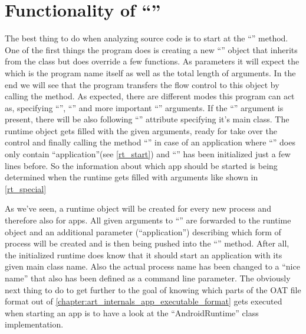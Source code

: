 \section{Functionality of ``''}
\label{section:app_main}
The best thing to do when analyzing source code is to start at the
``'' method. One of the first things the program does is
creating a new ``'' object that inherits from the
 class but does override a few functions. As parameters it will expect the 
which is the program name itself as well as the total length of arguments.
In the end we will see that the program transfers the flow control to this object by calling the  method. As expected, there
are different modes this program can act as, specifying ``'',
``'' and more important ``'' arguments.
If the ``'' argument is present, there will be also following ``'' attribute specifying it's main class.
The runtime object gets filled with the given arguments, ready for take
over the control and finally calling the method ``'' in case of an application
where ``'' does only contain ``application''(see \autoref{rt_start}) and ``'' has been initialized just a few lines before. So the information about which app should be started is being determined
when the runtime gets filled with arguments like shown in \autoref{rt_special}





As we've seen, a runtime object will be created for every new process and
therefore also for apps. All given arguments to ``''
are forwarded to the runtime object and an additional parameter (``application'') describing which form of process will be created and is then being pushed
into the ``'' method.
After all, the initialized runtime does know that it should start an application with its given main class name. Also the actual process name
has been changed to a ``nice name'' that also has been defined as a command
line parameter.
The obviously next thing to do to get further to the goal of knowing which parts of the OAT file format out of \autoref{chapter:art_internals_app_executable_format} gets executed when starting an app is to have a look at the ``AndroidRuntime'' class implementation.



